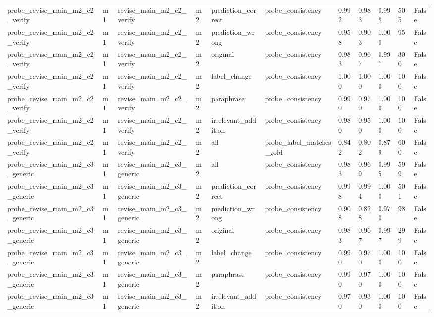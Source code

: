 \begin{tabular}{lllllllllll}
probe\_revise\_main\_m2\_c2\_verify & m1 & revise\_main\_m2\_c2\_verify & m2 & prediction\_correct & probe\_consistency & 0.992 & 0.983 & 0.998 & 505 & False \\
probe\_revise\_main\_m2\_c2\_verify & m1 & revise\_main\_m2\_c2\_verify & m2 & prediction\_wrong & probe\_consistency & 0.958 & 0.903 & 1.000 & 95 & False \\
probe\_revise\_main\_m2\_c2\_verify & m1 & revise\_main\_m2\_c2\_verify & m2 & original & probe\_consistency & 0.983 & 0.967 & 0.997 & 300 & False \\
probe\_revise\_main\_m2\_c2\_verify & m1 & revise\_main\_m2\_c2\_verify & m2 & label\_change & probe\_consistency & 1.000 & 1.000 & 1.000 & 100 & False \\
probe\_revise\_main\_m2\_c2\_verify & m1 & revise\_main\_m2\_c2\_verify & m2 & paraphrase & probe\_consistency & 0.990 & 0.970 & 1.000 & 100 & False \\
probe\_revise\_main\_m2\_c2\_verify & m1 & revise\_main\_m2\_c2\_verify & m2 & irrelevant\_addition & probe\_consistency & 0.980 & 0.950 & 1.000 & 100 & False \\
probe\_revise\_main\_m2\_c2\_verify & m1 & revise\_main\_m2\_c2\_verify & m2 & all & probe\_label\_matches\_gold & 0.842 & 0.802 & 0.879 & 600 & False \\
probe\_revise\_main\_m2\_c3\_generic & m1 & revise\_main\_m2\_c3\_generic & m2 & all & probe\_consistency & 0.983 & 0.969 & 0.995 & 599 & False \\
probe\_revise\_main\_m2\_c3\_generic & m1 & revise\_main\_m2\_c3\_generic & m2 & prediction\_correct & probe\_consistency & 0.998 & 0.994 & 1.000 & 501 & False \\
probe\_revise\_main\_m2\_c3\_generic & m1 & revise\_main\_m2\_c3\_generic & m2 & prediction\_wrong & probe\_consistency & 0.908 & 0.828 & 0.970 & 98 & False \\
probe\_revise\_main\_m2\_c3\_generic & m1 & revise\_main\_m2\_c3\_generic & m2 & original & probe\_consistency & 0.983 & 0.967 & 0.997 & 299 & False \\
probe\_revise\_main\_m2\_c3\_generic & m1 & revise\_main\_m2\_c3\_generic & m2 & label\_change & probe\_consistency & 0.990 & 0.970 & 1.000 & 100 & False \\
probe\_revise\_main\_m2\_c3\_generic & m1 & revise\_main\_m2\_c3\_generic & m2 & paraphrase & probe\_consistency & 0.990 & 0.970 & 1.000 & 100 & False \\
probe\_revise\_main\_m2\_c3\_generic & m1 & revise\_main\_m2\_c3\_generic & m2 & irrelevant\_addition & probe\_consistency & 0.970 & 0.930 & 1.000 & 100 & False \\

\end{tabular}
